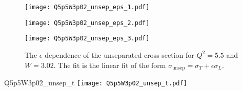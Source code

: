 \begin{figure}
  \centering
  \begin{minipage}[b]{0.48\linewidth}
    \texttt{[image: Q5p5W3p02\_unsep\_eps\_1.pdf]}
  \end{minipage}
  \hfill
  \begin{minipage}[b]{0.48\linewidth}
    \texttt{[image: Q5p5W3p02\_unsep\_eps\_2.pdf]}
  \end{minipage}
  \begin{minipage}[b]{0.48\linewidth}
    \texttt{[image: Q5p5W3p02\_unsep\_eps\_3.pdf]}
  \end{minipage}
  \caption{The $\epsilon$ dependence of the unseparated cross section for $Q^2=5.5$ and $W=3.02$. The fit is the linear fit of the form $\sigma_{\mathrm{unsep}}=\sigma_T+\epsilon\sigma_L$.}
  \label{fig:Q5p5W3p02_unsep_eps}
\end{figure}

\begin{Mfigure}{Q5p5W3p02_unsep_t}
  \centering
  \texttt{[image: Q5p5W3p02\_unsep\_t.pdf]}
  \caption{The $t$ dependence of the L and T separated cross sections for $Q^2=5.5$ and $W=3.02$ where the $-t$ values are the central bin values. The fit is exponential of the form $C\cdot e^{-b\cdot|t|}$, which for $\sigma_L$ follows the pole-like behavior.}
  \label{fig:Q5p5W3p02_unsep_t}
\end{Mfigure}


%
%

